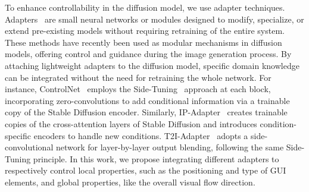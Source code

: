 To enhance controllability in the diffusion model, we use adapter techniques.
Adapters~\cite{adapters_in_nlp} are small neural networks or modules designed to modify, specialize, or extend pre-existing models without requiring retraining of the entire system. These methods have recently been used as modular mechanisms in diffusion models, offering control and guidance during the image generation process.
%
By attaching lightweight adapters to the diffusion model, specific domain knowledge can be integrated without the need for retraining the whole network. For instance, ControlNet~\cite{controlnet} employs the Side-Tuning~\cite{side_tune} approach at each block, incorporating zero-convolutions to add conditional information via a trainable copy of the Stable Diffusion encoder.
%
Similarly, IP-Adapter~\cite{ye2023ip} creates trainable copies of the cross-attention layers of Stable Diffusion and introduces condition-specific encoders to handle new conditions. T2I-Adapter~\cite{mou2024t2i} adopts a side-convolutional network for layer-by-layer output blending, following the same Side-Tuning principle.
%
In this work, we propose integrating different adapters to respectively control local properties, such as the positioning and type of GUI elements, and global properties, like the overall visual flow direction.












   




